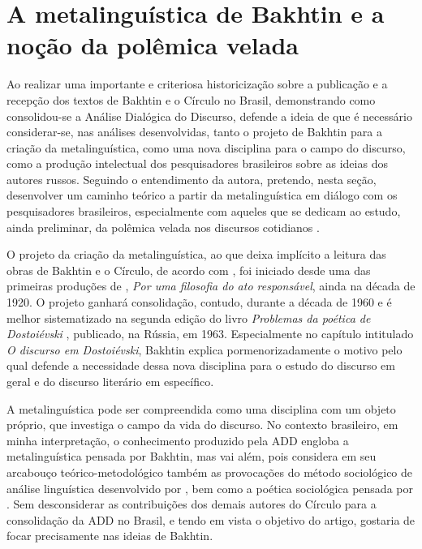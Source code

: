 \documentclass[portuguese]{textolivre}
\begin{document}
\section{A metalinguística de Bakhtin e a noção da polêmica velada}\label{sec-metalingBaktin}
Ao realizar uma importante e criteriosa historicização sobre a publicação e a recepção dos textos de Bakhtin e o Círculo no Brasil, demonstrando como consolidou-se a Análise Dialógica do Discurso, \textcite{portoboenavides2022publicacao} defende a ideia de que é necessário considerar-se, nas análises desenvolvidas, tanto o projeto de Bakhtin para a criação da metalinguística, como uma nova disciplina para o campo do discurso, como a produção intelectual dos pesquisadores brasileiros sobre as ideias dos autores russos. Seguindo o entendimento da autora, pretendo, nesta seção, desenvolver um caminho teórico a partir da metalinguística em diálogo com os pesquisadores brasileiros, especialmente com aqueles que se dedicam ao estudo, ainda preliminar, da polêmica velada nos discursos cotidianos \cite{silva2019analise,campos2021concepcao}.
	
O projeto da criação da metalinguística, ao que deixa implícito a leitura das obras de Bakhtin e o Círculo, de acordo com \textcite{silva2019analise}, foi iniciado desde uma das primeiras produções de \textcite{bakhtin2017filosofia}, \textit{Por uma filosofia do ato responsável}, ainda na década de 1920. O projeto ganhará consolidação, contudo, durante a década de 1960 e é melhor sistematizado na segunda edição do livro \textit{Problemas da poética de Dostoiévski} \cite{bakhtin2018problemas}, publicado, na Rússia, em 1963. Especialmente no capítulo intitulado \textit{O discurso em Dostoiévski}, Bakhtin explica pormenorizadamente o motivo pelo qual defende a necessidade dessa nova disciplina para o estudo do discurso em geral e do discurso literário em específico.
	
A metalinguística pode ser compreendida como uma disciplina com um objeto próprio, que investiga o campo da vida do discurso. No contexto brasileiro, em minha interpretação, o conhecimento produzido pela ADD engloba a metalinguística pensada por Bakhtin, mas vai além, pois considera em seu arcabouço teórico-metodológico também as provocações do método sociológico de análise linguística desenvolvido por \textcite{volochinov2018marxismo}, bem como a poética sociológica pensada por \textcite{medvedev2012metodo}. Sem desconsiderar as contribuições dos demais autores do Círculo para a consolidação da ADD no Brasil, e tendo em vista o objetivo do artigo, gostaria de focar precisamente nas ideias de Bakhtin.
	
\end{document}
